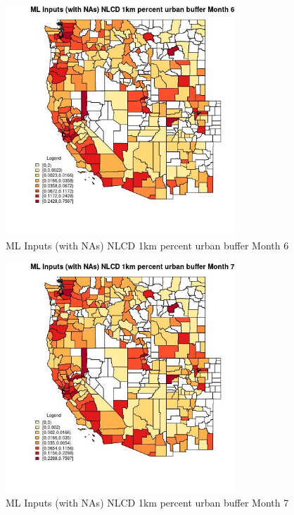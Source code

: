 \begin{figure} 
\centering  
\includegraphics[width=0.77\textwidth]{Code_Outputs/Report_ML_input_PM25_Step4_part_f_de_duplicated_aveswNAs_CountyNLCD_1km_percent_urban_buffermedianMonth6.jpg} 
\caption{\label{fig:Report_ML_input_PM25_Step4_part_f_de_duplicated_aveswNAsCountyNLCD_1km_percent_urban_buffermedianMonth6}ML Inputs (with NAs) NLCD 1km percent urban buffer Month 6} 
\end{figure} 
 

\begin{figure} 
\centering  
\includegraphics[width=0.77\textwidth]{Code_Outputs/Report_ML_input_PM25_Step4_part_f_de_duplicated_aveswNAs_CountyNLCD_1km_percent_urban_buffermedianMonth7.jpg} 
\caption{\label{fig:Report_ML_input_PM25_Step4_part_f_de_duplicated_aveswNAsCountyNLCD_1km_percent_urban_buffermedianMonth7}ML Inputs (with NAs) NLCD 1km percent urban buffer Month 7} 
\end{figure} 
 

